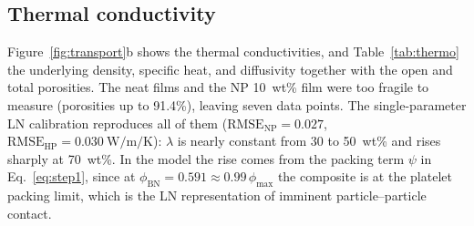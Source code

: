 \documentclass[preprint,a4paper]{elsarticle}
\newcommand{\lam}{\ensuremath{\lambda}}
\newcommand{\phimax}{\ensuremath{\phi_{\max}}}
\newcommand{\phiBN}{\ensuremath{\phi_{\mathrm{BN}}}}
\begin{document}
\subsection{Thermal conductivity}
\label{sec:thermal}
Figure~\ref{fig:transport}b shows the thermal conductivities, and Table~\ref{tab:thermo} the underlying density, specific heat, and diffusivity together with the open and total porosities. The neat films and the NP 10~wt\% film were too fragile to measure (porosities up to 91.4\%), leaving seven data points. The single-parameter LN calibration reproduces all of them ($\mathrm{RMSE}_{\mathrm{NP}} = 0.027$, $\mathrm{RMSE}_{\mathrm{HP}} = \SI{0.030}{\watt\per\meter\per\kelvin}$): \lam{} is nearly constant from 30 to 50~wt\% and rises sharply at 70~wt\%. In the model the rise comes from the packing term $\psi$ in Eq.~\ref{eq:step1}, since at $\phiBN = 0.591 \approx 0.99\,\phimax$ the composite is at the platelet packing limit, which is the LN representation of imminent particle--particle contact.
\end{document}
